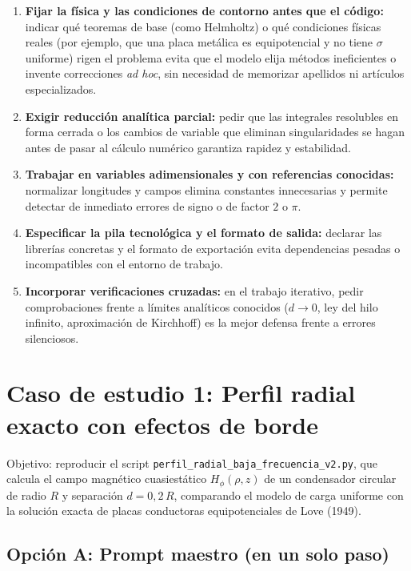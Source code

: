 \documentclass[11pt]{article}
\begin{document}
\begin{enumerate}
    \item \textbf{Fijar la física y las condiciones de contorno antes que el código:} indicar qué teoremas de base (como Helmholtz) o qué condiciones físicas reales (por ejemplo, que una placa metálica es equipotencial y no tiene $\sigma$ uniforme) rigen el problema evita que el modelo elija métodos ineficientes o invente correcciones \textit{ad hoc}, sin necesidad de memorizar apellidos ni artículos especializados.
    \item \textbf{Exigir reducción analítica parcial:} pedir que las integrales resolubles en forma cerrada o los cambios de variable que eliminan singularidades se hagan antes de pasar al cálculo numérico garantiza rapidez y estabilidad.
    \item \textbf{Trabajar en variables adimensionales y con referencias conocidas:} normalizar longitudes y campos elimina constantes innecesarias y permite detectar de inmediato errores de signo o de factor $2$ o $\pi$.
    \item \textbf{Especificar la pila tecnológica y el formato de salida:} declarar las librerías concretas y el formato de exportación evita dependencias pesadas o incompatibles con el entorno de trabajo.
    \item \textbf{Incorporar verificaciones cruzadas:} en el trabajo iterativo, pedir comprobaciones frente a límites analíticos conocidos ($d \to 0$, ley del hilo infinito, aproximación de Kirchhoff) es la mejor defensa frente a errores silenciosos.
\end{enumerate}

\section{Caso de estudio 1: Perfil radial exacto con efectos de borde}

Objetivo: reproducir el script \texttt{perfil\_radial\_baja\_frecuencia\_v2.py}, que calcula el campo magnético cuasiestático $H_\phi(\rho, z)$ de un condensador circular de radio $R$ y separación $d = 0{,}2\,R$, comparando el modelo de carga uniforme con la solución exacta de placas conductoras equipotenciales de Love (1949).

\subsection{Opción A: Prompt maestro (en un solo paso)}
\end{document}
